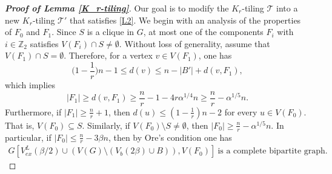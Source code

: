 \documentclass[11pt, a4paper]{article}
\theoremstyle{definition}
\newcommand{\<}{\subseteq}
\begin{document}
\begin{proof}[\bf Proof of Lemma \ref{K_r-tiling}]
Our goal is to  modify the $K_r$-tiling $\mathcal{T}$ into a new $K_{r}$-tiling $\mathcal{T}'$ that satisfies \ref{L2}. We begin with an analysis of the properties of $F_0$ and $F_1$.  %
Since $S$ is a clique in $G$, at most one of the components $F_i$ with $i\in\mathbb{Z}_2$ satisfies $V(F_i)\cap S\neq \emptyset.$  Without loss of generality, assume that $V(F_1)\cap S=\emptyset$. Therefore, for a vertex $v\in V(F_1)$, one has 
$$
\Big(1-\frac{1}{r}\Big)n-1\leq d(v)\leq n-|B'|+d(v,F_1),
$$
which implies 
$$
|F_1|\geq d(v,F_1)\geq \frac{n}{r}-1-4r\alpha^{1/4}n\geq \frac{n}{r}-\alpha^{1/5}n. 
$$
Furthermore, if $|F_1|\ge \frac{n}{r}+1$, then $d(u)\leq (1-\frac{1}{r})n-2$ for every $u\in V(F_0)$. That is,  $V(F_0)\subseteq S$.  Similarly, if $V(F_0)\setminus S\neq \emptyset$, then $|F_0|\geq \frac{n}{r}-\alpha^{1/5}n.$ In particular, if $|F_0|\leq \frac{n}{r}-3\beta n$, then by Ore's condition one has 
\begin{align}\label{complete}
G[V_{ex}^L(\beta/2)\cup (V(G)\setminus (V_b(2\beta)\cup B)),V(F_0)]\ \text{is a complete bipartite graph}.
\end{align}








\end{proof}
\end{document}
